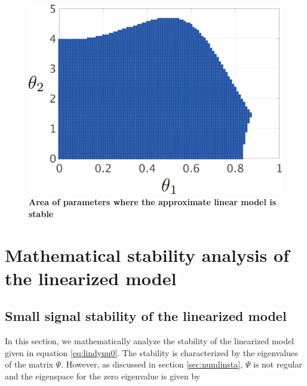 \documentclass[graybox, envcountchap]{svmult}
\begin{document}
\begin{figure}[t!]
{\begin{minipage}{0.49\linewidth}
    \medskip
  \end{minipage}
  \begin{minipage}{0.49\linewidth}
    \centering
    \includegraphics[width = 0.90\linewidth]{figs/Y0.01D0.01}
    \medskip
  \end{minipage}
}
 \caption{\textbf{Area of parameters where the approximate linear model is stable}}
 \label{fig:stacheck}
\medskip
\end{figure}


\section{Mathematical stability analysis of the linearized
model\advanced}\label{sec:linmathana}

\subsection{Small signal stability of the linearized model\advanced}
In this section, we mathematically analyze the stability of the linearized model
given in equation \ref{eq:lindynu0}. The stability is characterized by the
eigenvalues of the matrix $\Psi$. However, as discussed in section
\ref{sec:numlinsta}, $\Psi$ is not regular and the eigenspace for the zero
eigenvalue is given by
\end{document}
